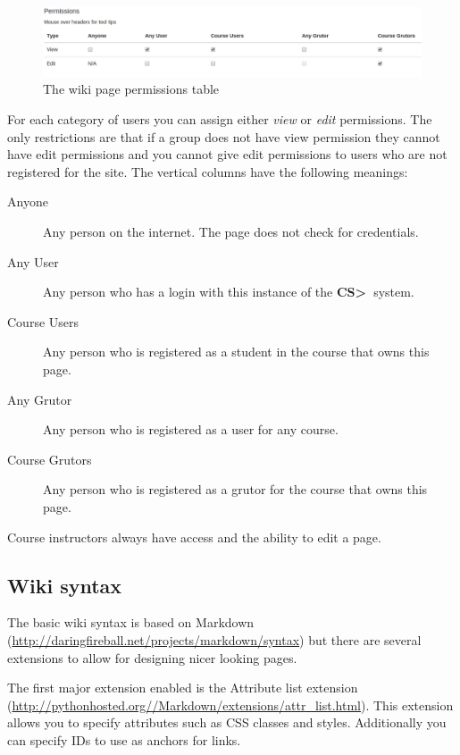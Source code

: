 \documentclass[11pt]{report}
\newcommand{\csgt}[0]{\textbf{CS\textgreater\ }}
\begin{document}
\begin{figure}
\centering
\includegraphics[width=\textwidth,height=\textheight,keepaspectratio]{diagrams/wiki_permissions}
\caption{The wiki page permissions table}
\label{fig:wiki_permissions}
\end{figure}

For each category of users you can assign either \emph{view} or \emph{edit} permissions. The only 
restrictions are that if a group does not have view permission they cannot have edit permissions and
you cannot give edit permissions to users who are not registered for the site. The vertical columns
have the following meanings:

\begin{description}
\item[Anyone] Any person on the internet. The page does not check for credentials.
\item[Any User] Any person who has a login with this instance of the \csgt system. 
\item[Course Users] Any person who is registered as a student in the course that owns this page.
\item[Any Grutor] Any person who is registered as a user for any course.
\item[Course Grutors] Any person who is registered as a grutor for the course that owns this page.
\end{description}

Course instructors always have access and the ability to edit a page. 

\subsection{Wiki syntax}
The basic wiki syntax is based on Markdown (\url{http://daringfireball.net/projects/markdown/syntax})
but there are several extensions to allow for designing nicer looking pages. 

The first major extension enabled is the Attribute list extension 
(\url{http://pythonhosted.org//Markdown/extensions/attr_list.html}).
This extension allows you to specify attributes such as CSS classes and styles. Additionally
you can specify IDs to use as anchors for links. 
\end{document}
